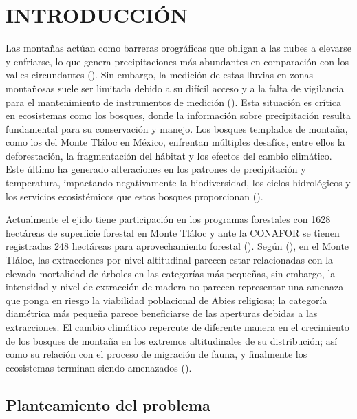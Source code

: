 \chapter{INTRODUCCIÓN}
\setcounter{page}{1}

Las montañas actúan como barreras orográficas que obligan a las nubes a elevarse y enfriarse, lo que genera precipitaciones más abundantes en comparación con los valles circundantes (\cite{CruzMiranda2021}). Sin embargo, la medición de estas lluvias en zonas montañosas suele ser limitada debido a su difícil acceso y a la falta de vigilancia para el mantenimiento de instrumentos de medición (\cite{aparicio1992}). Esta situación es crítica en ecosistemas como los bosques, donde la información sobre precipitación resulta fundamental para su conservación y manejo. Los bosques templados de montaña, como los del Monte Tláloc en México, enfrentan múltiples desafíos, entre ellos la deforestación, la fragmentación del hábitat y los efectos del cambio climático. Este último ha generado alteraciones en los patrones de precipitación y temperatura, impactando negativamente la biodiversidad, los ciclos hidrológicos y los servicios ecosistémicos que estos bosques proporcionan (\cite{gonzalez2016}).

Actualmente el ejido tiene participación en los programas forestales con 1628 hectáreas de superficie forestal en Monte Tláloc y ante la CONAFOR se tienen registradas 248 hectáreas para aprovechamiento forestal (\cite{nava2014}). Según (\cite{lopez2023}), en el Monte Tláloc, las extracciones por nivel altitudinal parecen estar relacionadas con la elevada mortalidad de árboles en las categorías más pequeñas, sin embargo, la intensidad y nivel de extracción de madera no parecen representar una amenaza que ponga en riesgo la viabilidad poblacional de Abies religiosa; la categoría diamétrica más pequeña parece beneficiarse de las aperturas debidas a las extracciones. El cambio climático repercute de diferente manera en el crecimiento de los bosques de montaña en los extremos altitudinales de su distribución; así como su relación con el proceso de migración de fauna, y finalmente los ecosistemas terminan siendo amenazados (\cite{hernandez2021}).



\newpage
\section{Planteamiento del problema}

